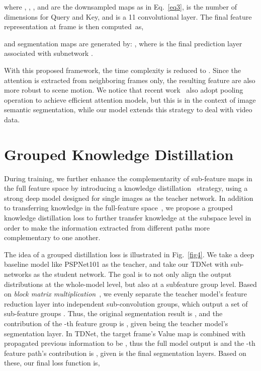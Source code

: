 \documentclass[10pt,twocolumn,letterpaper]{article}
\begin{document}
where , , , and  are the downsampled maps as in Eq.~\ref{eq3},   is the number of dimensions for Query and Key, and  is a 11 convolutional layer.
The final feature representation at frame  is then computed~as,

and segmentation maps are generated by: , where  is the final prediction layer associated with subnetwork .

With this proposed framework, the time complexity is reduced to . 
Since the attention is extracted from neighboring frames only, the resulting feature are also more robust to scene motion. 
We notice that recent work~\cite{Zhu_2019_ICCV} also adopt pooling operation to achieve efficient attention models, but this is in the context of image semantic segmentation, while our model extends this strategy to deal with video data.

\section{Grouped Knowledge Distillation} 
\label{sec_gkd}

During training, we further enhance the complementarity of sub-feature maps in the full feature space by introducing a knowledge distillation~\cite{hinton2015distilling} strategy, using a strong deep model designed for single images as the teacher network. 
In addition to transferring knowledge in the full-feature space~\cite{hinton2015distilling,Liu_2019_CVPR,He_2019_CVPR}, we propose a grouped knowledge distillation loss to further transfer knowledge at the subspace level in order to make the information extracted from different paths more complementary to one another.

The idea of a grouped distillation loss is illustrated in Fig.~\ref{fig4}. 
We take a deep baseline model like PSPNet101 as the teacher, and take our TDNet with  sub-networks as the student network. 
The goal is to not only align the output distributions at the whole-model level, but also at a subfeature group level. 
Based on \textit{block matrix multiplication}~\cite{eves1980elementary}, we evenly separate the teacher model's feature reduction layer into  independent sub-convolution groups, which output a set of sub-feature groups . 
Thus, the original segmentation result is , and the contribution of the -th feature group is , given   being the teacher model's segmentation layer. 
In TDNet, the target frame's Value map  is combined with propagated previous information to be , thus the full model output is  and the -th feature path's contribution is , given  is the final segmentation layers. Based on these, our final loss function is,
\end{document}
